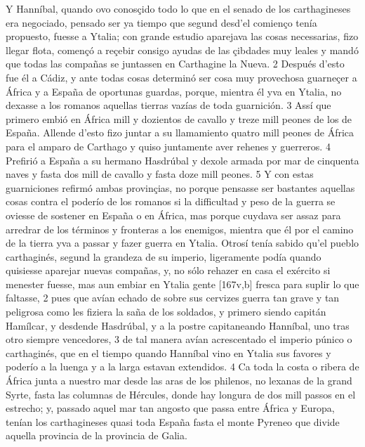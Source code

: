 \documentclass[11pt,twoside]{article}\makeatletter
\def\persName{}\def\name{}
\def\placeName{}
\begin{document}
\pend
{} Y  {\persName Hanníbal}, quando ovo conosçido todo lo que en el senado de los  {\name carthagineses} era negociado, pensado ser ya tiempo que segund desd'el comienço tenía propuesto, fuesse a Ytalia; con grande estudio aparejava las cosas necessarias, fizo llegar flota, començó a reçebir consigo ayudas de las çibdades muy leales y mandó que todas las compañas se juntassen en  {\placeName Carthagine la Nueva}. 2 Después d'esto fue él a Cádiz, y ante todas cosas determinó ser cosa muy provechosa guarneçer a  {\placeName África} y a  {\placeName España} de oportunas guardas, porque, mientra él yva en Ytalia, no dexasse a los romanos aquellas tierras vazías de toda guarnición. 3 Assí que primero embió en  {\placeName África} mill y dozientos de cavallo y treze mill peones de los de  {\placeName España}. Allende d'esto fizo juntar a su llamamiento quatro mill peones de  {\placeName África} para el amparo de  {\placeName Carthago} y quiso juntamente aver rehenes y guerreros. 4 Prefirió a  {\placeName España} a su hermano  {\persName Hasdrúbal} y dexole armada por mar de cinquenta naves y fasta dos mill de cavallo y fasta doze mill peones. 5 Y con estas guarniciones refirmó ambas provinçias, no porque pensasse ser bastantes aquellas cosas contra el poderío de los romanos si la difficultad y peso de la guerra se oviesse de sostener en  {\placeName España} o en  {\placeName África}, mas porque cuydava ser assaz para arredrar de los términos y fronteras a los enemigos, mientra que él por el camino de la tierra yva a passar y fazer guerra en Ytalia.
\pend
{} Otrosí tenía sabido qu’el pueblo carthaginés, segund la grandeza de su imperio, ligeramente podía quando quisiesse aparejar nuevas compañas, y, no sólo rehazer en casa el exército si menester fuesse, mas aun embiar en Ytalia gente %
[167v,b] fresca para suplir lo que faltasse, 2 pues que avían echado de sobre sus cervizes guerra tan grave y tan peligrosa como les fiziera la saña de los soldados, y primero siendo capitán  {\persName Hamílcar}, y desdende  {\persName Hasdrúbal}, y a la postre capitaneando  {\persName Hanníbal}, uno tras otro siempre vencedores, 3 de tal manera avían acrescentado el imperio púnico o carthaginés, que en el tiempo quando  {\persName Hanníbal} vino en  {\placeName Ytalia} sus favores y poderío a la luenga y a la larga estavan extendidos. 4 Ca toda la costa o ribera de  {\placeName África} junta a nuestro mar desde las aras de los philenos, no lexanas de la grand Syrte, fasta las columnas de Hércules, donde hay longura de dos mill passos en el estrecho; y, passado aquel mar tan angosto que passa entre  {\placeName África} y  {\placeName Europa}, tenían los  {\name carthagineses} quasi toda  {\placeName España} fasta el  {\placeName monte Pyreneo} que divide aquella provincia de la provincia de  {\placeName Galia}.
\end{document}
